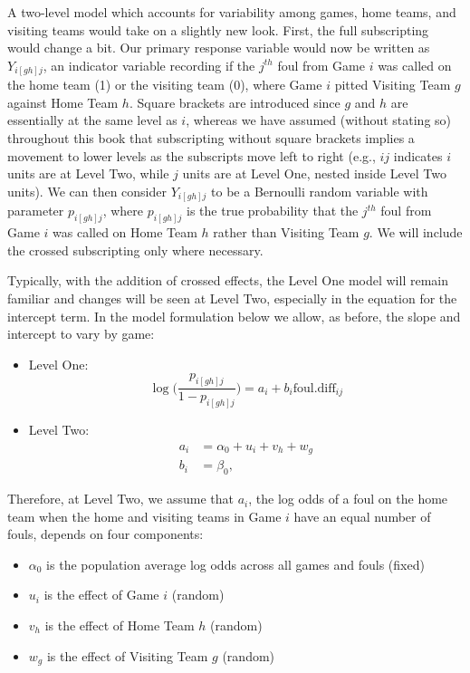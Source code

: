\documentclass[
]{krantz}
\providecommand{\tightlist}{%
  \setlength{\itemsep}{0pt}\setlength{\parskip}{0pt}}
\begin{document}
A two-level model which accounts for variability among games, home teams, and visiting teams would take on a slightly new look. First, the full subscripting would change a bit. Our primary response variable would now be written as \(Y_{i[gh]j}\), an indicator variable recording if the \(j^{th}\) foul from Game \(i\) was called on the home team (1) or the visiting team (0), where Game \(i\) pitted Visiting Team \(g\) against Home Team \(h\). Square brackets are introduced since \(g\) and \(h\) are essentially at the same level as \(i\), whereas we have assumed (without stating so) throughout this book that subscripting without square brackets implies a movement to lower levels as the subscripts move left to right (e.g., \(ij\) indicates \(i\) units are at Level Two, while \(j\) units are at Level One, nested inside Level Two units). We can then consider \(Y_{i[gh]j}\) to be a Bernoulli random variable with parameter \(p_{i[gh]j}\), where \(p_{i[gh]j}\) is the true probability that the \(j^{th}\) foul from Game \(i\) was called on Home Team \(h\) rather than Visiting Team \(g\). We will include the crossed subscripting only where necessary.

Typically, with the addition of crossed effects, the Level One model will remain familiar and changes will be seen at Level Two, especially in the equation for the intercept term. In the model formulation below we allow, as before, the slope and intercept to vary by game:

\begin{itemize}
\tightlist
\item
  Level One:
  \begin{equation}
  \log\bigg(\frac{p_{i[gh]j}}{1-p_{i[gh]j}}\bigg)=a_{i}+b_{i}\mathrm{foul.diff}_{ij}
  \label{eq:lev1cross} 
  \end{equation}
\item
  Level Two:
  \begin{align*}
  a_{i} & = \alpha_{0}+u_{i}+v_{h}+w_{g} \\
  b_{i} & = \beta_{0},
  \end{align*}
\end{itemize}

Therefore, at Level Two, we assume that \(a_{i}\), the log odds of a foul on the home team when the home and visiting teams in Game \(i\) have an equal number of fouls, depends on four components:

\begin{itemize}
\tightlist
\item
  \(\alpha_{0}\) is the population average log odds across all games and fouls (fixed)
\item
  \(u_{i}\) is the effect of Game \(i\) (random)
\item
  \(v_{h}\) is the effect of Home Team \(h\) (random)
\item
  \(w_{g}\) is the effect of Visiting Team \(g\) (random)
\end{itemize}
\end{document}
